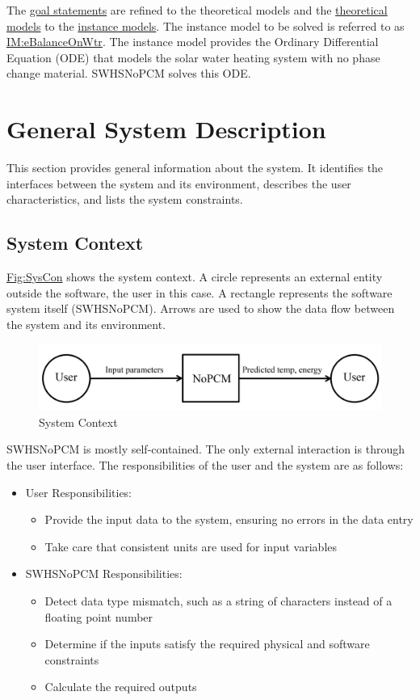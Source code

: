 \documentclass[12pt]{article}
\begin{document}
The \hyperref[Sec:GoalStmt]{goal statements} are refined to the theoretical models and the \hyperref[Sec:TMs]{theoretical models} to the \hyperref[Sec:IMs]{instance models}. The instance model to be solved is referred to as \hyperref[IM:eBalanceOnWtr]{IM:eBalanceOnWtr}. The instance model provides the Ordinary Differential Equation (ODE) that models the solar water heating system with no phase change material. SWHSNoPCM solves this ODE.

\section{General System Description}
\label{Sec:GenSysDesc}
This section provides general information about the system. It identifies the interfaces between the system and its environment, describes the user characteristics, and lists the system constraints.

\subsection{System Context}
\label{Sec:SysContext}
\hyperref[Figure:SysCon]{Fig:SysCon} shows the system context. A circle represents an external entity outside the software, the user in this case. A rectangle represents the software system itself (SWHSNoPCM). Arrows are used to show the data flow between the system and its environment.

\begin{figure}[H]
\begin{center}
\includegraphics[width=\textwidth]{../../../../datafiles/swhsnopcm/SystemContextFigure.png}
\caption{System Context}
\label{Figure:SysCon}
\end{center}
\end{figure}
SWHSNoPCM is mostly self-contained. The only external interaction is through the user interface. The responsibilities of the user and the system are as follows:

\begin{itemize}
\item{User Responsibilities:}
\begin{itemize}
\item{Provide the input data to the system, ensuring no errors in the data entry}
\item{Take care that consistent units are used for input variables}
\end{itemize}
\item{SWHSNoPCM Responsibilities:}
\begin{itemize}
\item{Detect data type mismatch, such as a string of characters instead of a floating point number}
\item{Determine if the inputs satisfy the required physical and software constraints}
\item{Calculate the required outputs}
\end{itemize}
\end{itemize}
\end{document}
